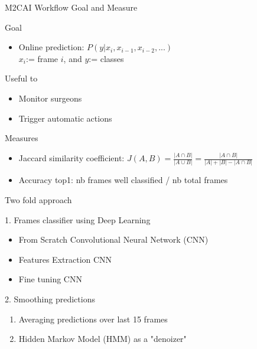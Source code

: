 \begin{frame}{M2CAI Workflow Goal and Measure}
	
		\begin{block}{Goal}
			\vspace{-.2cm}
	  	\begin{itemize}
	  		\item Online prediction: $P(y | x_i, x_{i-1}, x_{i-2}, ...)$   \\ \hspace{2cm}
	  		$x_i$:= frame $i$, and $y$:= classes
	  	\end{itemize}
		\end{block}
		
		
		
		\begin{block}{Useful to}
			\vspace{-.2cm}
		\begin{itemize}
			\item Monitor surgeons
			\item Trigger automatic actions
		\end{itemize}
		\end{block}
		
		\begin{block}{Measures}
						\vspace{-.2cm}
		\begin{itemize}
			\item Jaccard similarity coefficient:
	    $J(A,B) = \frac{| A \cap B |}{| A \cup B|} = \frac{| A \cap B |}{| A| + |B| - |A \cap B|}$
	    
	  		\item Accuracy top1: nb frames well classified / nb total frames
	  	\end{itemize}
	  	\end{block}
		
\end{frame}

\begin{frame}{Two fold approach}

	\begin{block}{1. Frames classifier using Deep Learning}
	\begin{itemize}
		\item From Scratch Convolutional Neural Network (CNN)
		\item Features Extraction CNN 
		\item Fine tuning CNN
	\end{itemize}
	\end{block}
	
	\begin{block}{2. Smoothing predictions}
	\begin{enumerate}	
		\item Averaging predictions over last 15 frames %
		\item Hidden Markov Model (HMM) as a "denoizer" 
	\end{enumerate}
	\end{block}
	
\end{frame}


